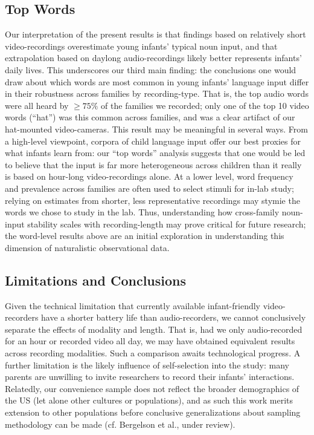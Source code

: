 \documentclass[floatsintext,man]{apa6}
\theoremstyle{definition}
\theoremstyle{definition}
\theoremstyle{definition}
\theoremstyle{remark}
\begin{document}
\hypertarget{top-words}{%
\subsection{Top Words}\label{top-words}}

Our interpretation of the present results is that findings based on
relatively short video-recordings overestimate young infants' typical
noun input, and that extrapolation based on daylong audio-recordings
likely better represents infants' daily lives. This underscores our
third main finding: the conclusions one would draw about which words are
most common in young infants' language input differ in their robustness
across families by recording-type. That is, the top audio words were all
heard by \(\geq 75\%\) of the families we recorded; only one of the top
10 video words (\enquote{hat}) was this common across families, and was
a clear artifact of our hat-mounted video-cameras. This result may be
meaningful in several ways. From a high-level viewpoint, corpora of
child language input offer our best proxies for what infants learn from:
our \enquote{top words} analysis suggests that one would be led to
believe that the input is far more heterogeneous across children than it
really is based on hour-long video-recordings alone. At a lower level,
word frequency and prevalence across families are often used to select
stimuli for in-lab study; relying on estimates from shorter, less
representative recordings may stymie the words we chose to study in the
lab. Thus, understanding how cross-family noun-input stability scales
with recording-length may prove critical for future research; the
word-level results above are an initial exploration in understanding
this dimension of naturalistic observational data.

\hypertarget{limitations-and-conclusions}{%
\subsection{Limitations and
Conclusions}\label{limitations-and-conclusions}}

Given the technical limitation that currently available infant-friendly
video-recorders have a shorter battery life than audio-recorders, we
cannot conclusively separate the effects of modality and length. That
is, had we only audio-recorded for an hour or recorded video all day, we
may have obtained equivalent results across recording modalities. Such a
comparison awaits technological progress. A further limitation is the
likely influence of self-selection into the study: many parents are
unwilling to invite researchers to record their infants' interactions.
Relatedly, our convenience sample does not reflect the broader
demographics of the US (let alone other cultures or populations), and as
such this work merits extension to other populations before conclusive
generalizations about sampling methodology can be made (cf. Bergelson et
al., under review).
\end{document}
